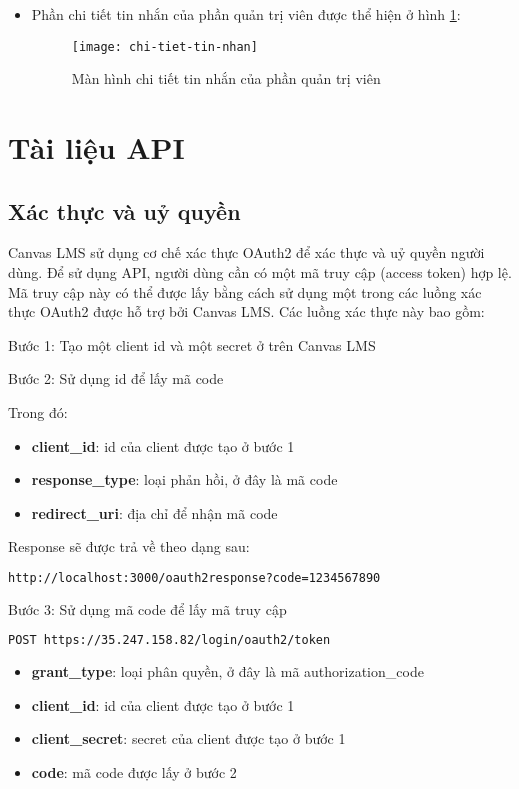 \documentclass[../Thesis.tex]{subfiles}
\begin{document}
\begin{itemize}
                \item Phần chi tiết tin nhắn của phần quản trị viên được thể hiện ở hình \ref{fig:chi-tiet-tin-nhan}:
                \begin{figure}[hbt!]
                    \centering\texttt{[image: chi-tiet-tin-nhan]}
                    \caption{Màn hình chi tiết tin nhắn của phần quản trị viên}
                    \label{fig:chi-tiet-tin-nhan}
                \end{figure}
                \FloatBarrier
        \end{itemize}

\section{Tài liệu API}
    \subsection{Xác thực và uỷ quyền}
        Canvas LMS sử dụng cơ chế xác thực OAuth2 để xác thực và uỷ quyền người dùng. Để sử dụng API, người dùng cần có một mã truy cập (access token) hợp lệ. Mã truy cập này có thể được lấy bằng cách sử dụng một trong các luồng xác thực OAuth2 được hỗ trợ bởi Canvas LMS. Các luồng xác thực này bao gồm:
        
        Bước 1: Tạo một client id và một secret ở trên Canvas LMS
        
        Bước 2: Sử dụng id để lấy mã code
        
            Trong đó:
            \begin{itemize}
            \item \textbf{client\_id}: id của client được tạo ở bước 1
            \item \textbf{response\_type}: loại phản hồi, ở đây là mã code
            \item \textbf{redirect\_uri}: địa chỉ để nhận mã code
            \end{itemize}

            Response sẽ được trả về theo dạng sau:
            \begin{lstlisting}[language=bash]
            http://localhost:3000/oauth2response?code=1234567890
            \end{lstlisting}

        Bước 3: Sử dụng mã code để lấy mã truy cập
        \begin{lstlisting}[language=bash]
            POST https://35.247.158.82/login/oauth2/token
        \end{lstlisting}
        \begin{itemize}
            \item \textbf{grant\_type}: loại phân quyền, ở đây là mã authorization\_code
            \item \textbf{client\_id}: id của client được tạo ở bước 1
            \item \textbf{client\_secret}: secret của client được tạo ở bước 1
            \item \textbf{code}: mã code được lấy ở bước 2
        \end{itemize}
\end{document}
